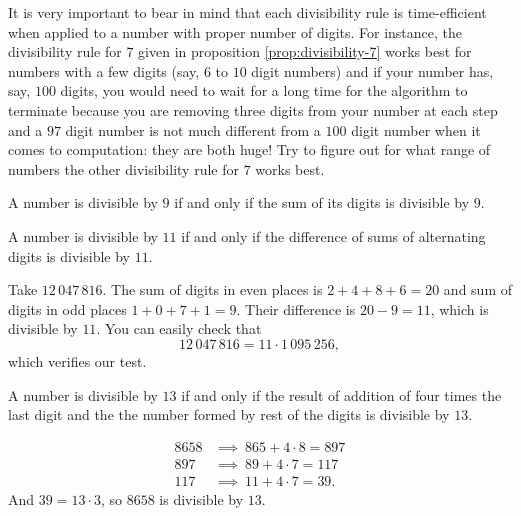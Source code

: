 \documentclass{subfile}
\begin{document}
It is very important to bear in mind that each divisibility rule is time-efficient when applied to a number with proper number of digits. For instance, the divisibility rule for $7$ given in proposition \eqref{prop:divisibility-7} works best for numbers with a few digits (say, $6$ to $10$ digit numbers) and if your number has, say, $100$ digits, you would need to wait for a long time for the algorithm to terminate because you are removing three digits from your number at each step and a $97$ digit number is not much different from a $100$ digit number when it comes to computation: they are both huge! Try to figure out for what range of numbers the other divisibility rule for $7$ works best.


	\begin{proposition}[Divisibility by $9$]
		A number is divisible by $9$ if and only if the sum of its digits is divisible by $9$.
	\end{proposition}


	\begin{proposition}[Divisibility by $11$]
		A number is divisible by $11$ if and only if the difference of sums of alternating digits is divisible by $11$.
	\end{proposition}

	\begin{example}
		Take $12 \, 047 \, 816$. The sum of digits in even places is $2+4+8+6=20$ and sum of digits in odd places $1+0+7+1=9$. Their difference is $20-9=11$, which is divisible by $11$. You can easily check that $$12 \, 047 \, 816=11\cdot1 \,095\, 256,$$ which verifies our test.
	\end{example}

	\begin{proposition}[Divisibility by $13$]
		A number is divisible by $13$ if and only if the result of addition of four times the last digit and the the number formed by rest of the digits is divisible by $13$.
	\end{proposition}

	\begin{example}
		\begin{align*}
			8658 & \implies \ 865 + 4 \cdot 8 = 897 \\
			897 & \implies  \ 89 + 4 \cdot 7 =   117 \\
			117 & \implies \ 11 + 4 \cdot 7 =  39.
		\end{align*}
		And $39 = 13 \cdot 3$, so $8658$ is divisible by $13$.
	\end{example}
\end{document}
